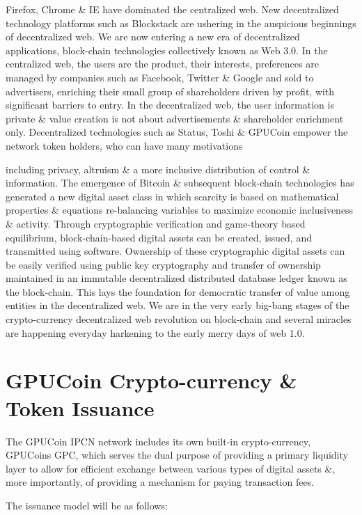 \documentclass{article}
\begin{document}
Firefox, Chrome \& IE have dominated the centralized web. New decentralized technology platforms such as Blockstack are ushering in the auspicious beginnings of decentralized web. 
We are now entering a new era of decentralized applications, block-chain technologies collectively known as Web 3.0. In the centralized web, the users are the product, their interests, preferences are managed
 by companies such as Facebook, Twitter \& Google and sold to advertisers, enriching their small group of shareholders driven by profit, with significant barriers to entry. In the
decentralized web, the user information is private \& value creation is not about advertisements \& shareholder enrichment only. Decentralized
technologies such as Status, Toshi \& GPUCoin empower the network token holders, who can have many motivations 

 including privacy, altruism \& a more inclusive distribution of control \& information. The emergence of Bitcoin \& subsequent block-chain technologies has generated a new digital asset class in which scarcity is based on mathematical properties \& equations re-balancing variables to maximize economic inclusiveness \& activity. Through cryptographic verification and game-theory based equilibrium, block-chain-based digital assets can be created, issued, and transmitted using software. Ownership of these cryptographic digital assets can be easily verified using public key cryptography and transfer of ownership maintained in an immutable decentralized distributed database ledger known as the block-chain. This lays the foundation for democratic transfer of value among entities in the decentralized web.
We are in the very early big-bang stages of the crypto-currency decentralized web revolution on block-chain and several miracles are happening everyday harkening to the early merry days of web 1.0.

\section{GPUCoin Crypto-currency \& Token Issuance}

The GPUCoin IPCN network includes its own built-in crypto-currency, GPUCoins GPC, which serves the dual purpose of providing a primary liquidity layer to allow for efficient exchange between various types of digital assets \&, more importantly, of providing a mechanism for paying transaction fees.

The issuance model will be as follows:
\end{document}
